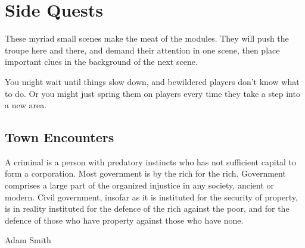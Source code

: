 \chapter{Side Quests}

\begin{multicols}{2}

\noindent
These myriad small scenes make the meat of the modules.
They will push the troupe here and there, and demand their attention in one scene, then place important clues in the background of the next scene.

You might wait until things slow down, and bewildered players don't know what to do.
Or you might just spring them on players every time they take a step into a new area.
\end{multicols}

\section{Town Encounters}

\epigraph{A criminal is a person with predatory instincts who has not sufficient capital to form a corporation. Most government is by the rich for the rich.
Government comprises a large part of the organized injustice in any society, ancient or modern.
Civil government, insofar as it is instituted for the security of property, is in reality instituted for the defence of the rich against the poor, and for the defence of those who have property against those who have none.}%
{Adam Smith}


\renewcommand{\sqarea}{Town}

\setcounter{encnum}{1}


